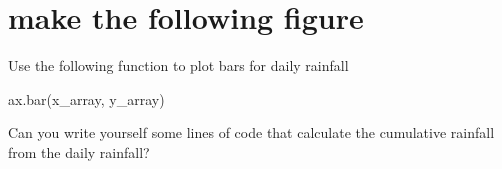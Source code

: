 \documentclass[
  letterpaper,
  DIV=11,
  numbers=noendperiod]{scrreprt}
\newenvironment{Shaded}{\begin{snugshade}}{\end{snugshade}}
\newcommand{\NormalTok}[1]{\textcolor[rgb]{0.00,0.23,0.31}{#1}}
\begin{document}
\hypertarget{make-the-following-figure}{%
\section{make the following figure}\label{make-the-following-figure}}

Use the following function to plot bars for daily rainfall

\begin{Shaded}
\begin{Highlighting}[]
\NormalTok{ax.bar(x\_array, y\_array)}
\end{Highlighting}
\end{Shaded}

Can you write yourself some lines of code that calculate the cumulative
rainfall from the daily rainfall?
\end{document}
